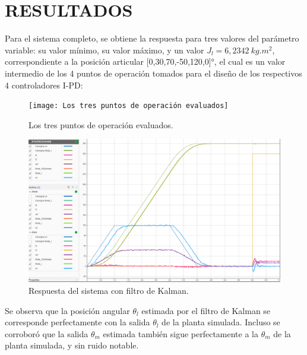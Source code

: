 \documentclass{article}
\begin{document}
\begin{sloppypar}
\section{RESULTADOS}
\label{sec:RESULTADOS}

Para el sistema completo, se obtiene la respuesta para tres valores del parámetro variable: su valor mínimo, su valor máximo, y un valor $J_l=6,2342 ~kg.m^2$, correspondiente a la posición articular [0,30,70,-50,120,0]°, el cual es un valor intermedio de los 4 puntos de operación tomados para el diseño de los respectivos 4 controladores I-PD:

\begin{figure}[H]
    \centering
    \texttt{[image: Los tres puntos de operación evaluados]}
    \caption{Los tres puntos de operación evaluados.}
    \label{fig:Los tres puntos de operación evaluados}
\end{figure}

\begin{figure}[H]
    \centering
    \includegraphics[width=1\textwidth]{Respuesta del sistema con filtro de Kalman}
    \caption{Respuesta del sistema con filtro de Kalman.}
    \label{fig:Respuesta del sistema con filtro de Kalman}
\end{figure}

Se observa que la posición angular $\theta_l$ estimada por el filtro de Kalman se corresponde perfectamente con la salida $\theta_l$ de la planta simulada. Incluso se corroboró que la salida $\theta_m$ estimada también sigue perfectamente a la $\theta_m$ de la planta simulada, y sin ruido notable.


\end{sloppypar}
\end{document}
